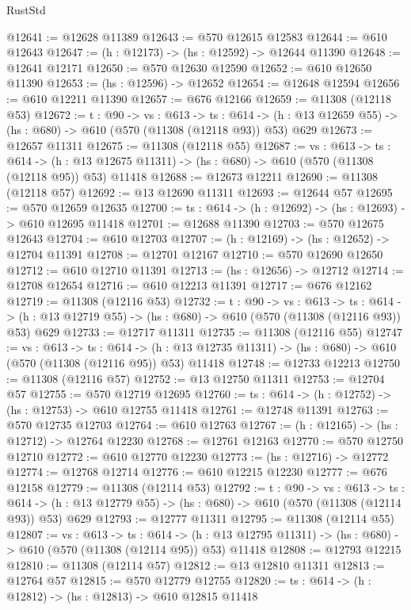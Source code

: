 \begin{lexlean}{RustStd}
\begin{coremodule}
@12641 := @12628 @11389
@12643 := @570 @12615 @12583
@12644 := @610 @12643
@12647 := (h : @12173) -> (hs : @12592) -> @12644 @11390
@12648 := @12641 @12171
@12650 := @570 @12630 @12590
@12652 := @610 @12650 @11390
@12653 := (hs : @12596) -> @12652
@12654 := @12648 @12594
@12656 := @610 @12211 @11390
@12657 := @676 @12166
@12659 := @11308 (@12118 @53)
@12672 := {t : @90} ->
  {vs : @613} ->
  {ts : @614} -> (h : @13 @12659 @55) -> (hs : @680) -> @610 (@570 (@11308 (@12118 @93)) @53) @629
@12673 := @12657 @11311
@12675 := @11308 (@12118 @55)
@12687 := {vs : @613} ->
  {ts : @614} ->
  (h : @13 @12675 @11311) -> (hs : @680) -> @610 (@570 (@11308 (@12118 @95)) @53) @11418
@12688 := @12673 @12211
@12690 := @11308 (@12118 @57)
@12692 := @13 @12690 @11311
@12693 := @12644 @57
@12695 := @570 @12659 @12635
@12700 := {ts : @614} -> (h : @12692) -> (hs : @12693) -> @610 @12695 @11418
@12701 := @12688 @11390
@12703 := @570 @12675 @12643
@12704 := @610 @12703
@12707 := (h : @12169) -> (hs : @12652) -> @12704 @11391
@12708 := @12701 @12167
@12710 := @570 @12690 @12650
@12712 := @610 @12710 @11391
@12713 := (hs : @12656) -> @12712
@12714 := @12708 @12654
@12716 := @610 @12213 @11391
@12717 := @676 @12162
@12719 := @11308 (@12116 @53)
@12732 := {t : @90} ->
  {vs : @613} ->
  {ts : @614} -> (h : @13 @12719 @55) -> (hs : @680) -> @610 (@570 (@11308 (@12116 @93)) @53) @629
@12733 := @12717 @11311
@12735 := @11308 (@12116 @55)
@12747 := {vs : @613} ->
  {ts : @614} ->
  (h : @13 @12735 @11311) -> (hs : @680) -> @610 (@570 (@11308 (@12116 @95)) @53) @11418
@12748 := @12733 @12213
@12750 := @11308 (@12116 @57)
@12752 := @13 @12750 @11311
@12753 := @12704 @57
@12755 := @570 @12719 @12695
@12760 := {ts : @614} -> (h : @12752) -> (hs : @12753) -> @610 @12755 @11418
@12761 := @12748 @11391
@12763 := @570 @12735 @12703
@12764 := @610 @12763
@12767 := (h : @12165) -> (hs : @12712) -> @12764 @12230
@12768 := @12761 @12163
@12770 := @570 @12750 @12710
@12772 := @610 @12770 @12230
@12773 := (hs : @12716) -> @12772
@12774 := @12768 @12714
@12776 := @610 @12215 @12230
@12777 := @676 @12158
@12779 := @11308 (@12114 @53)
@12792 := {t : @90} ->
  {vs : @613} ->
  {ts : @614} -> (h : @13 @12779 @55) -> (hs : @680) -> @610 (@570 (@11308 (@12114 @93)) @53) @629
@12793 := @12777 @11311
@12795 := @11308 (@12114 @55)
@12807 := {vs : @613} ->
  {ts : @614} ->
  (h : @13 @12795 @11311) -> (hs : @680) -> @610 (@570 (@11308 (@12114 @95)) @53) @11418
@12808 := @12793 @12215
@12810 := @11308 (@12114 @57)
@12812 := @13 @12810 @11311
@12813 := @12764 @57
@12815 := @570 @12779 @12755
@12820 := {ts : @614} -> (h : @12812) -> (hs : @12813) -> @610 @12815 @11418

\end{coremodule}
\end{lexlean}
